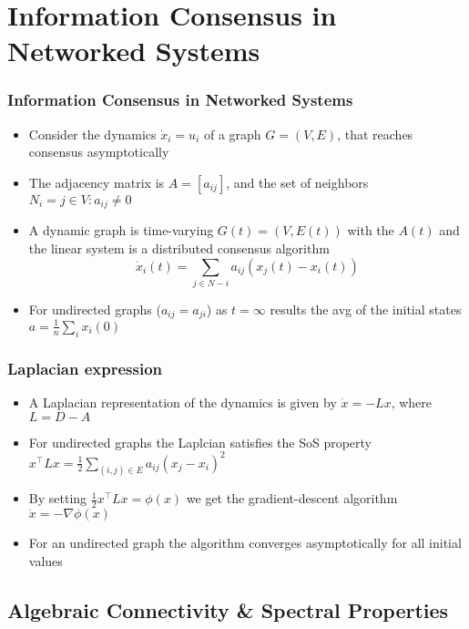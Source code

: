 \documentclass{beamer}
\begin{document}
\section{Information Consensus in Networked Systems}

\begin{frame}
\frametitle{Information Consensus in Networked Systems}
\begin{itemize}
\item Consider the dynamics $\dot{x}_i=u_i$ of a graph $G=(V,E)$, that reaches consensus asymptotically
\item The adjacency matrix is $A=[a_{ij}]$, and the set of neighbors $N_i = {j \in V : a_{ij}\ne 0}$
\item A dynamic graph is time-varying $G(t)=(V,E(t))$ with the $A(t)$ and the linear system is a distributed consensus algorithm
\begin{equation*}
\dot{x}_i(t) = \sum_{j \in N-i}a_{ij}(x_j(t)-x_i(t))
\end{equation*}
\item For undirected graphs ($a_{ij}=a_{ji}$) as $t=\infty$ results the avg of the initial states $a=\frac{1}{n}\sum_i x_i(0)$
\end{itemize}
\end{frame}


\begin{frame}
\frametitle{Laplacian expression}
\begin{itemize}
\item A Laplacian representation of the dynamics is given by $\dot{x} = -Lx$, where $L=D-A$
\item For undirected graphs the Laplcian satisfies the SoS property $x^{\intercal}Lx=\frac{1}{2}\sum_{(i,j)\in E}a_{ij}(x_j-x_i)^2$
\item By setting $\frac{1}{2}x^{\intercal}Lx=\phi(x)$ we get the gradient-descent algorithm $\dot{x}=-\nabla \phi(x)$
\item For an undirected graph the algorithm converges asymptotically for all initial values
\end{itemize}
\end{frame}

\subsection{Algebraic Connectivity \& Spectral Properties}
\end{document}
